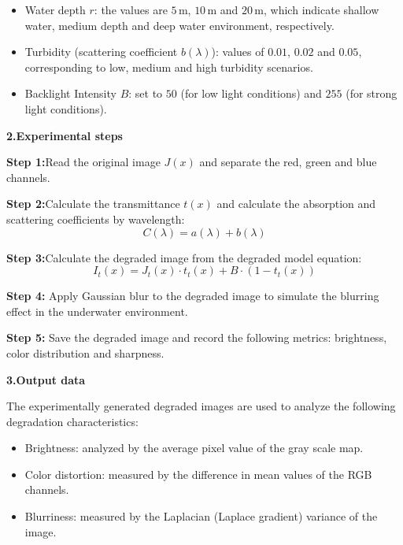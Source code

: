 \documentclass[withoutpreface,bwprint]{cumcmthesis}
\begin{document}
 \begin{itemize}[itemindent=2em]

    \item  Water depth $r$: the values are $5 \, \text{m}$, $10 \, \text{m}$ and $20 \, \text{m}$, which indicate shallow water, medium depth and deep water environment, respectively. 
        
     \item Turbidity (scattering coefficient $b(\lambda)$): values of $0.01$, $0.02$ and $0.05$, corresponding to low, medium and high turbidity scenarios.  

     \item Backlight Intensity $B$: set to $50$ (for low light conditions) and $255$ (for strong light conditions).  

 \end{itemize}

 \textbf{2.Experimental steps}

\textbf{Step 1:}Read the original image $J(x)$ and separate the red, green and blue channels.

\vspace{0.5em}
\textbf{Step 2:}Calculate the transmittance $t(x)$ and calculate the absorption and scattering coefficients by wavelength:  
        \[C(\lambda) = a(\lambda) + b(\lambda)\]

\vspace{0.5em}
\textbf{Step 3:}Calculate the degraded image from the degraded model equation:
    \[I_t(x) = J_t(x) \cdot t_t(x) + B \cdot (1 - t_t(x))\]

\vspace{0.5em}
\textbf{Step 4:} Apply Gaussian blur to the degraded image to simulate the blurring effect in the underwater environment. 

\vspace{0.5em}
\textbf{Step 5:} Save the degraded image and record the following metrics: brightness, color distribution and sharpness.


 \textbf{3.Output data}

 The experimentally generated degraded images are used to analyze the following degradation characteristics:

 \begin{itemize}[itemindent=2em]
     \item Brightness: analyzed by the average pixel value of the gray scale map.  

     \item Color distortion: measured by the difference in mean values of the RGB channels.

     \item Blurriness: measured by the Laplacian (Laplace gradient) variance of the image.
 \end{itemize}
\end{document}
